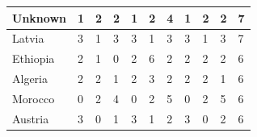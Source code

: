 \documentclass[12pt]{article}  %
\begin{document}
\begin{subappendices}
\begin{longtable}{|l|l|l|l|l|l|l|l|l|l|l|}
	\hline
	Unknown                                                        & 1                                                 & 2                                                 & 2                                                 & 1                                                 & 2                                                 & 4                                                 & 1    & 2      & 2      & 7      \\ 
	\hline
	Latvia                                                         & 3                                                 & 1                                                 & 3                                                 & 3                                                 & 1                                                 & 3                                                 & 3    & 1      & 3      & 7      \\ 
	\hline
	Ethiopia                                                       & 2                                                 & 1                                                 & 0                                                 & 2                                                 & 6                                                 & 2                                                 & 2    & 2      & 2      & 6      \\ 
	\hline
	Algeria                                                        & 2                                                 & 2                                                 & 1                                                 & 2                                                 & 3                                                 & 2                                                 & 2    & 2      & 1      & 6      \\ 
	\hline
	Morocco                                                        & 0                                                 & 2                                                 & 4                                                 & 0                                                 & 2                                                 & 5                                                 & 0    & 2      & 5      & 6      \\ 
	\hline
	Austria                                                        & 3                                                 & 0                                                 & 1                                                 & 3                                                 & 1                                                 & 2                                                 & 3    & 0      & 2      & 6      \\ 

\end{longtable}
\end{subappendices}
\end{document}
